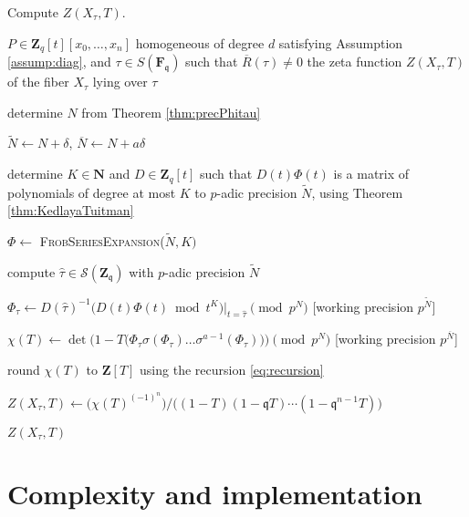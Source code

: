 \documentclass[a4paper,11pt]{article}
\numberwithin{equation}{section}
\newcommand{\NN}{\mathbf{N}} %
\newcommand{\ZZ}{\mathbf{Z}} %
\theoremstyle{definition}
\begin{document}
\begin{algorithm} 
\caption{Compute $Z(X_{\tau},T)$.}
\label{alg:complete}
\begin{algorithmic}
\vspace{1mm}
\Require $P \in \ZZ_q[t][x_0,\ldots,x_n]$ homogeneous of degree $d$ satisfying Assumption \ref{assump:diag}, and $\tau \in S(\mathbf{F}_{\mathfrak{q}})$ such that $\overline{R}(\tau) \neq 0$
\Ensure  the zeta function $Z(X_{\tau},T)$ of the fiber $X_{\tau}$ lying over $\tau$
\State \begin{compactenum}[{\hspace{1em} } 1.] \vspace{-1.24em}
\item determine $N$ from Theorem \ref{thm:precPhitau}
\item $\tilde{N} \gets N + \delta$, $\overline{N} \gets N+a \delta$
\item determine $K \in \NN$ and $D \in \ZZ_q[t]$ such that $D(t) \Phi(t)$ is a matrix of polynomials 
      of degree at most $K$ to $p$-adic precision $\tilde{N}$, using Theorem \ref{thm:KedlayaTuitman}
\item $\Phi \gets$ \textsc{FrobSeriesExpansion($\tilde{N},K)$}
\item compute $\hat{\tau} \in \mathcal{S}(\ZZ_{\mathfrak{q}})$ with $p$-adic precision $\tilde{N}$
\item $\Phi_{\tau} \gets D(\hat{\tau})^{-1} \bigl( D(t) \Phi(t) \bmod{t^{K}} \bigr)|_{t=\hat{\tau}} \pmod{p^{N}}$ [working precision $p^{\tilde{N}}$]
\item $\chi(T) \gets \det\bigl(1-T \bigl(\Phi_{\tau} \sigma(\Phi_{\tau}) \ldots \sigma^{a-1}(\Phi_{\tau}) \bigr)  \bigr) \pmod{p^{N}}$ [working precision $p^{\overline{N}}$]
\item round $\chi(T)$ to $\ZZ[T]$ using the recursion \eqref{eq:recursion} 
\item $Z(X_{\tau},T) \gets \bigl( \chi(T)^{(-1)^n} \bigr)/\bigl((1 - T) (1 - \mathfrak{q}T) \dotsm (1 - \mathfrak{q}^{n-1}T)\bigr)$
\item \Return $Z(X_{\tau},T)$
\end{compactenum}
\EndProcedure
\end{algorithmic}
\end{algorithm}


\section{Complexity and implementation}
\end{document}
